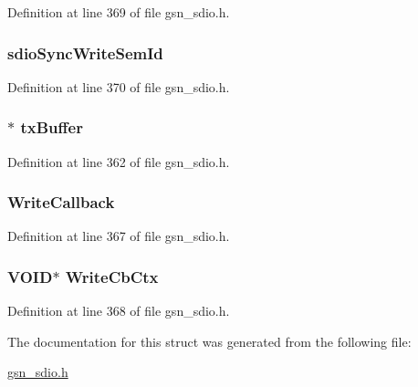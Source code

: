 Definition at line 369 of file gsn\_\-sdio.h.

\hypertarget{a00216_a0e257037e5914a566c80658b7aece012}{
\subsubsection[{sdioSyncWriteSemId}]{ {\bf sdioSyncWriteSemId}}}
\label{a00216_a0e257037e5914a566c80658b7aece012}


Definition at line 370 of file gsn\_\-sdio.h.

\hypertarget{a00216_aaa16ff66d9982ada7aebae8e16dd1579}{
\subsubsection[{txBuffer}]{$\ast$ {\bf txBuffer}}}
\label{a00216_aaa16ff66d9982ada7aebae8e16dd1579}


Definition at line 362 of file gsn\_\-sdio.h.

\hypertarget{a00216_a0d869ce47f1054167ac5c8bbd7ac6835}{
\subsubsection[{WriteCallback}]{ {\bf WriteCallback}}}
\label{a00216_a0d869ce47f1054167ac5c8bbd7ac6835}


Definition at line 367 of file gsn\_\-sdio.h.

\hypertarget{a00216_aa649829459755e39af4893f8557347e5}{
\subsubsection[{WriteCbCtx}]{\setlength{\rightskip}{0pt plus 5cm}VOID$\ast$ {\bf WriteCbCtx}}}
\label{a00216_aa649829459755e39af4893f8557347e5}


Definition at line 368 of file gsn\_\-sdio.h.



The documentation for this struct was generated from the following file:\begin{DoxyCompactItemize}
\item 
\hyperlink{a00584}{gsn\_\-sdio.h}\end{DoxyCompactItemize}
